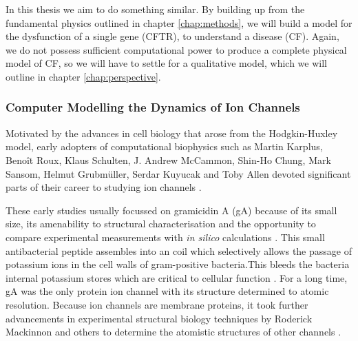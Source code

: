 In this thesis we aim to do something similar. By building up from the fundamental physics outlined in chapter \ref{chap:methods}, we will build a model for the dysfunction of a single gene (CFTR), to understand a disease (CF). Again, we do not possess sufficient computational power to produce a complete physical model of CF, so we will have to settle for a qualitative model, which we will outline in chapter \ref{chap:perspective}. 


\subsubsection{Computer Modelling the Dynamics of Ion Channels}
Motivated by the advances in cell biology that arose from the Hodgkin-Huxley model, early adopters of computational biophysics such as Martin Karplus, Beno\^it Roux, Klaus Schulten, J. Andrew McCammon, Shin-Ho Chung, Mark Sansom, Helmut Grubm\"uller, Serdar Kuyucak and Toby Allen devoted significant parts of their career to studying ion channels \cite{mccammon1977, sansom1991, roux1991, roux1993, sansom1991, tajkhorshid2002, degroot2001, allen2003, allen2004, chung2002, tieleman2001}. 

These early studies usually focussed on gramicidin A (gA) because of its small size, its amenability to structural characterisation and the opportunity to compare experimental measurements with \textit{in silico} calculations \cite{urry1971,arseniev1985,wallace1986,wallace1998}. This small antibacterial peptide assembles into an coil which selectively allows the passage of potassium ions in the cell walls of gram-positive bacteria.This bleeds the bacteria internal potassium stores which are critical to cellular function \cite{liou2015}. For a long time, gA was the only protein ion channel with its structure determined to atomic resolution. Because ion channels are membrane proteins, it took further advancements in experimental structural biology techniques by Roderick Mackinnon and others to determine the atomistic structures of other channels \cite{kuhlbrandt2014, clapham2003, doyle1998}. 


